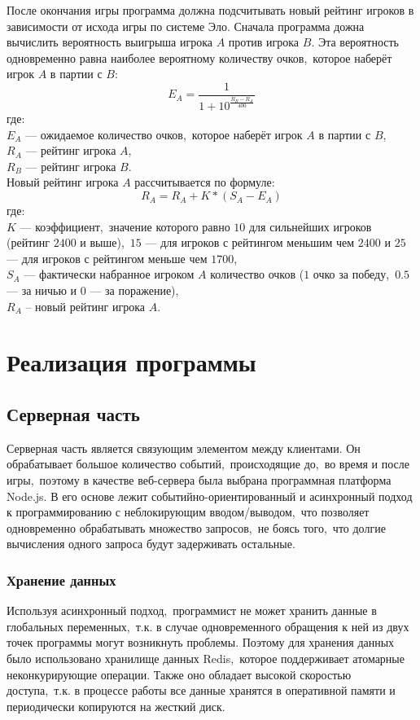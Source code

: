\documentclass[14pt,a4paper]{report}
\makeatletter
\newif\if@prechapterused
\let\oldchapter\chapter
\renewcommand{\chapter}[1]
{
\if@prechapterused\vspace{-2em}\@prechapterusedfalse\fi
\begingroup
	\let\clearpage\relax
	\let\cleardoublepage\relax
	\oldchapter{#1}
\endgroup
}
\makeatother
\begin{document}
После окончания игры программа должна подсчитывать новый рейтинг игроков в зависимости от исхода игры по системе Эло. Сначала программа дожна вычислить вероятность выигрыша игрока $A$ против игрока $B$. Эта вероятность одновременно равна наиболее вероятному количеству очков,~которое наберёт игрок $A$ в партии с $B$:
$$
E_A = \frac{1}{1 + 10^{\frac{R_B - R_A}{400}}}
$$
где:\\
$E_A$ --- ожидаемое количество очков,~которое наберёт игрок $A$ в партии с $B$,\\
$R_A$ --- рейтинг игрока $A$,\\
$R_B$ --- рейтинг игрока $B$.\\

Новый рейтинг игрока $A$ рассчитывается по формуле:
$$
R_A = R_A + K * (S_A - E_A)
$$
где:\\
$K$ --- коэффициент,~значение которого равно $10$ для сильнейших игроков (рейтинг $2400$ и выше),~$15$ --- для игроков с рейтингом меньшим чем $2400$ и $25$ --- для игроков с рейтингом меньше чем $1700$,\\
$S_A$ --- фактически набранное игроком $A$ количество очков ($1$ очко за победу,~$0.5$ --- за ничью и $0$ --- за поражение),\\
$R_A$ – новый рейтинг игрока $A$. \\

\newpage
\vspace*{-2cm}
\chapter{Реализация программы}

\section{Серверная часть}
Серверная часть является связующим элементом между клиентами. Он обрабатывает большое количество событий,~происходящие до,~во время и после игры,~поэтому в качестве веб-сервера была выбрана программная платформа Node.js. В его основе лежит событийно-ориентированный и асинхронный подход к программированию с неблокирующим вводом/выводом,~что позволяет одновременно обрабатывать множество запросов,~не боясь того,~что долгие вычисления одного запроса будут задерживать остальные.

\subsection{Хранение данных}
Используя асинхронный подход,~программист не может хранить данные в глобальных переменных,~т.к. в случае одновременного обращения к ней из двух точек программы могут возникнуть проблемы. Поэтому для хранения данных было использовано хранилище данных Redis,~которое поддерживает атомарные неконкурирующие операции. Также оно обладает высокой скоростью доступа,~т.к. в процессе работы все данные хранятся в оперативной памяти и периодически копируются на жесткий диск.
\end{document}
